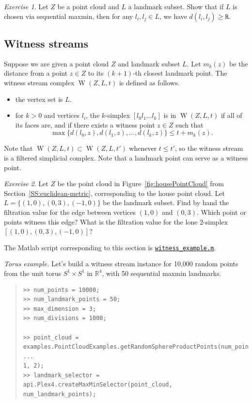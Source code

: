 \documentclass[amscd, amssymb, verbatim]{amsart}[12pt]
\theoremstyle{remark}
\newtheorem{exercise}{Exercise}
\theoremstyle{remark}
\theoremstyle{remark}
\DeclareMathOperator{\W}{W}
\newcommand{\R}{\mathbb{R}}
\begin{document}
\begin{exercise}
Let $Z$ be a point cloud and $L$ a landmark subset. Show that if $L$ is chosen via sequential maxmin, then for any $l_i,l_j\in L$, we have $d(l_i,l_j)\geq\texttt{R}$. 
\end{exercise}


\subsection{Witness streams}
Suppose we are given a point cloud $Z$ and landmark subset $L$. Let $m_k(z)$ be the distance from a point $z \in Z$ to its $(k+1)$-th closest landmark point. The witness stream complex $\W(Z,L,t)$ is defined as follows.
\begin{itemize}
\item{the vertex set is $L$.}
\item{for $k>0$ and vertices $l_i$, the $k$-simplex $[l_0 l_1 ... l_k]$ is in $\W(Z,L,t)$ if all of its faces are, and if there exists a witness point $z \in Z$ such that $$\max\bigl\{d(l_0,z), d(l_1,z), ..., d(l_k,z)\bigr\} \leq t+m_k(z).$$ }
\end{itemize}
Note that $\W(Z,L,t) \subset \W(Z,L,t')$ whenever $t\leq t'$, so the witness stream is a filtered simplicial complex. Note that a landmark point can serve as a witness point. 

\begin{exercise}\label{Ex:witnessHouse}
Let $Z$ be the point cloud in Figure~\ref{fig:housePointCloud} from Section~\ref{SS:euclidean-metric}, corresponding to the house point cloud. Let $L = \{(1,0),(0,3),(-1,0)\}$ be the landmark subset. Find by hand the filtration value for the edge between vertices $(1,0)$ and $(0,3)$. Which point or points witness this edge? What is the filtration value for the lone 2-simplex $[(1,0),(0,3),(-1,0)]$? 
\end{exercise}

The Matlab script corresponding to this section is \href{https://github.com/appliedtopology/javaplex/tree/master/src/matlab/for_distribution/tutorial_examples/witness_example.m}{\texttt{witness\_example.m}}.

{\em Torus example.} Let's build a witness stream instance for 10,000 random points from the unit torus $S^1 \times S^1$ in $\R^4$, with 50 sequential maxmin landmarks.

\begin{quote} \begin{verbatim}
>> num_points = 10000;
>> num_landmark_points = 50;
>> max_dimension = 3;
>> num_divisions = 1000;

>> point_cloud = examples.PointCloudExamples.getRandomSphereProductPoints(num_points, ...
1, 2);
>> landmark_selector = api.Plex4.createMaxMinSelector(point_cloud, num_landmark_points);
\end{verbatim} \end{quote}
\end{document}
